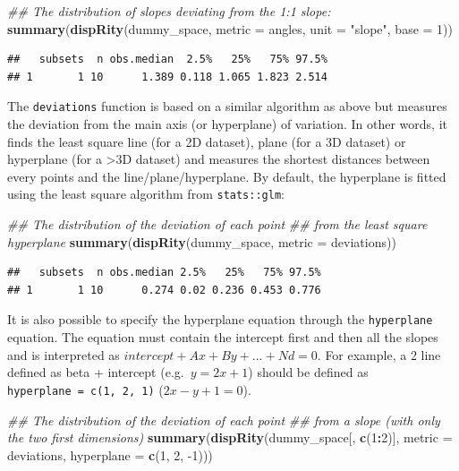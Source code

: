 \documentclass[
]{book}
\newenvironment{Shaded}{\begin{snugshade}}{\end{snugshade}}
\newcommand{\CommentTok}[1]{\textcolor[rgb]{0.56,0.35,0.01}{\textit{#1}}}
\newcommand{\DataTypeTok}[1]{\textcolor[rgb]{0.13,0.29,0.53}{#1}}
\newcommand{\DecValTok}[1]{\textcolor[rgb]{0.00,0.00,0.81}{#1}}
\newcommand{\KeywordTok}[1]{\textcolor[rgb]{0.13,0.29,0.53}{\textbf{#1}}}
\newcommand{\NormalTok}[1]{#1}
\newcommand{\OperatorTok}[1]{\textcolor[rgb]{0.81,0.36,0.00}{\textbf{#1}}}
\newcommand{\StringTok}[1]{\textcolor[rgb]{0.31,0.60,0.02}{#1}}
\begin{document}
\begin{Shaded}
\begin{Highlighting}[]
\CommentTok{\#\# The distribution of slopes deviating from the 1:1 slope:}
\KeywordTok{summary}\NormalTok{(}\KeywordTok{dispRity}\NormalTok{(dummy\_space, }\DataTypeTok{metric =}\NormalTok{ angles, }\DataTypeTok{unit =} \StringTok{"slope"}\NormalTok{,}
                 \DataTypeTok{base =} \DecValTok{1}\NormalTok{))}
\end{Highlighting}
\end{Shaded}

\begin{verbatim}
##   subsets  n obs.median  2.5%   25%   75% 97.5%
## 1       1 10      1.389 0.118 1.065 1.823 2.514
\end{verbatim}

The \texttt{deviations} function is based on a similar algorithm as above but measures the deviation from the main axis (or hyperplane) of variation.
In other words, it finds the least square line (for a 2D dataset), plane (for a 3D dataset) or hyperplane (for a \textgreater3D dataset) and measures the shortest distances between every points and the line/plane/hyperplane.
By default, the hyperplane is fitted using the least square algorithm from \texttt{stats::glm}:

\begin{Shaded}
\begin{Highlighting}[]
\CommentTok{\#\# The distribution of the deviation of each point}
\CommentTok{\#\# from the least square hyperplane}
\KeywordTok{summary}\NormalTok{(}\KeywordTok{dispRity}\NormalTok{(dummy\_space, }\DataTypeTok{metric =}\NormalTok{ deviations))}
\end{Highlighting}
\end{Shaded}

\begin{verbatim}
##   subsets  n obs.median 2.5%   25%   75% 97.5%
## 1       1 10      0.274 0.02 0.236 0.453 0.776
\end{verbatim}

It is also possible to specify the hyperplane equation through the \texttt{hyperplane} equation. The equation must contain the intercept first and then all the slopes and is interpreted as \(intercept + Ax + By + ... + Nd = 0\). For example, a 2 line defined as beta + intercept (e.g.~\(y = 2x + 1\)) should be defined as \texttt{hyperplane\ =\ c(1,\ 2,\ 1)} (\(2x - y + 1 = 0\)).

\begin{Shaded}
\begin{Highlighting}[]
\CommentTok{\#\# The distribution of the deviation of each point}
\CommentTok{\#\# from a slope (with only the two first dimensions)}
\KeywordTok{summary}\NormalTok{(}\KeywordTok{dispRity}\NormalTok{(dummy\_space[, }\KeywordTok{c}\NormalTok{(}\DecValTok{1}\OperatorTok{:}\DecValTok{2}\NormalTok{)], }\DataTypeTok{metric =}\NormalTok{ deviations,}
                 \DataTypeTok{hyperplane =} \KeywordTok{c}\NormalTok{(}\DecValTok{1}\NormalTok{, }\DecValTok{2}\NormalTok{, }\DecValTok{{-}1}\NormalTok{)))}
\end{Highlighting}
\end{Shaded}
\end{document}
